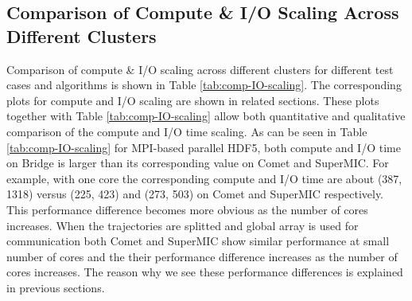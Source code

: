 \subsection{Comparison of Compute \& I/O Scaling Across Different Clusters}
Comparison of compute \& I/O scaling across different clusters for different test cases and algorithms is shown in Table \ref{tab:comp-IO-scaling}. 
The corresponding plots for compute and I/O scaling are shown in related sections. 
These plots together with Table \ref{tab:comp-IO-scaling} allow both quantitative and qualitative comparison of the compute and I/O time scaling.
As can be seen in Table \ref{tab:comp-IO-scaling} for MPI-based parallel HDF5, both compute and I/O time on Bridge is larger than its corresponding value on Comet and SuperMIC.
For example, with one core the corresponding compute and I/O time are about (387, 1318) versus (225, 423) and (273, 503) on Comet and SuperMIC respectively.
This performance difference becomes more obvious as the number of cores increases.
When the trajectories are splitted and global array is used for communication both Comet and SuperMIC show similar performance at small number of cores and the their performance difference increases as the number of cores increases. 
The reason why we see these performance differences is explained in previous sections. 

